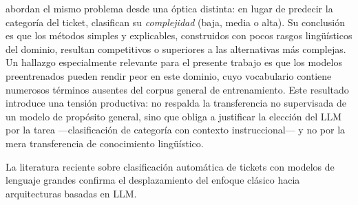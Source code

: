 \textcite{Revina2020_it_tickets} abordan el mismo problema desde una óptica distinta: en lugar de predecir la categoría del ticket, clasifican su \emph{complejidad} (baja, media o alta). Su conclusión es que los métodos simples y explicables, construidos con pocos rasgos lingüísticos del dominio, resultan competitivos o superiores a las alternativas más complejas. Un hallazgo especialmente relevante para el presente trabajo es que los modelos preentrenados pueden rendir peor en este dominio, cuyo vocabulario contiene numerosos términos ausentes del corpus general de entrenamiento. Este resultado introduce una tensión productiva: no respalda la transferencia no supervisada de un modelo de propósito general, sino que obliga a justificar la elección del LLM por la tarea ---clasificación de categoría con contexto instruccional--- y no por la mera transferencia de conocimiento lingüístico.

La literatura reciente sobre clasificación automática de tickets con modelos de lenguaje grandes confirma el desplazamiento del enfoque clásico hacia arquitecturas basadas en LLM.

